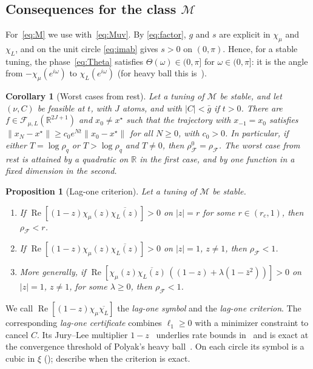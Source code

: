 \documentclass[11pt]{article}
\newtheorem{proposition}[theorem]{Proposition}
\newtheorem{corollary}[theorem]{Corollary}
\theoremstyle{definition}
\theoremstyle{remark}
\newcommand{\R}{\mathbb R}
\newcommand{\cF}{\mathcal F}
\newcommand{\cM}{\mathcal M}
\newcommand{\Rea}{\operatorname{Re}}
\newcommand{\norm}[1]{\lVert #1\rVert}
\newcommand{\rhoF}{\rho_{\cF}}
\newcommand{\rhoz}{\rho_{\cF}^{0}}
\begin{document}
\subsection{Consequences for the class \texorpdfstring{\(\cM\)}{M}}
\label{sec:closureM}

For~\eqref{eq:M} we use  with~\eqref{eq:Muv}.  By
\eqref{eq:factor}, \(g\) and \(s\) are explicit in \(\chi_\mu\) and
\(\chi_L\), and on the unit circle \eqref{eq:imab} gives \(s>0\) on
\((0,\pi)\).  Hence, for a stable tuning, the phase~\eqref{eq:Theta} satisfies \(\Theta(\omega)\in(0,\pi]\) for
\(\omega\in(0,\pi]\): it is the angle from \(-\chi_\mu(e^{i\omega})\) to \(\chi_L(e^{i\omega})\) (for heavy ball this
is~\cite[Definition~3.1]{TA}).

\begin{corollary}[Worst cases from rest]\label{cor:rest}
Let a tuning of \(\cM\) be stable, and let \((\nu,C)\) be feasible at \(t\),
with \(J\) atoms, and with \(|C|<\bar g\) if \(t>0\).  There are
\(f\in\cF_{\mu,L}(\R^{2J+1})\) and \(x_0\ne x^\star\) such that the
trajectory with \(x_{-1}=x_0\) satisfies
\(\norm{x_N-x^\star}\ge c_0e^{Nt}\norm{x_0-x^\star}\) for all \(N\ge0\), with
\(c_0>0\).  In particular, if either \(T=\log\rho_q\) or \(T>\log\rho_q\) and \(T\ne0\), then
\(\rhoz=\rhoF\).  The worst case from rest is attained by a quadratic on \(\R\) in the first case,
and by one function in a fixed dimension in the second.
\end{corollary}

\begin{proposition}[Lag-one criterion]\label{prop:lagone}
Let a tuning of \(\cM\) be stable.
\begin{enumerate}[label=\textup{(\alph*)}]
\item If \(\Rea[(1-z)\chi_\mu(z)\overline{\chi_L(z)}]>0\) on \(|z|=r\) for
some \(r\in(r_c,1)\), then \(\rhoF<r\).
\item If \(\Rea[(1-z)\chi_\mu(z)\overline{\chi_L(z)}]>0\) on \(|z|=1\),
\(z\ne1\), then \(\rhoF<1\).
\item More generally, if \(\Rea[\chi_\mu(z)\overline{\chi_L(z)}\,((1-z)+\lambda(1-\bar z^2))]>0\)
on \(|z|=1\), \(z\ne1\), for some \(\lambda\ge0\), then \(\rhoF<1\).
\end{enumerate}
\end{proposition}

We call \(\Rea[(1-z)\chi_\mu\overline{\chi_L}]\) the \emph{lag-one symbol}
and  the \emph{lag-one criterion}.  The corresponding
\emph{lag-one certificate} combines \(\ell_1\ge0\) with a minimizer constraint
to cancel \(C\).  Its Jury--Lee multiplier \(1-z\)~\cite{JL64} underlies
rate bounds in~\cite{LRP16,CHVL18,Gan22} and is exact at the convergence
threshold of Polyak's heavy ball~\cite{BS19}.  On each circle its symbol is
a cubic in \(\xi\) ();  describe
when the criterion is exact.
\end{document}
